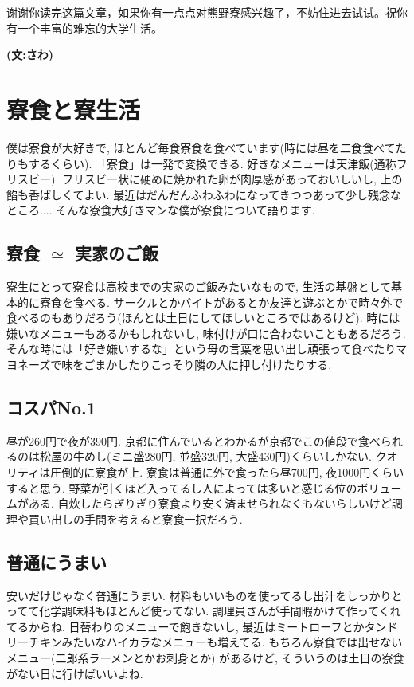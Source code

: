 \documentclass[10pt,b5jsbook,dvips,dvipdfmx,openany]{jsbook}
\theoremstyle{definition}
\begin{document}
谢谢你读完这篇文章，如果你有一点点对熊野寮感兴趣了，不妨住进去试试。祝你有一个丰富的难忘的大学生活。



    {\bf (文:さわ)}

	\section{寮食と寮生活}

	僕は寮食が大好きで, ほとんど毎食寮食を食べています(時には昼を二食食べてたりもするくらい). 「寮食」は一発で変換できる. 好きなメニューは天津飯(通称フリスビー). フリスビー状に硬めに焼かれた卵が肉厚感があっておいしいし, 上の餡も香ばしくてよい. 最近はだんだんふわふわになってきつつあって少し残念なところ.... そんな寮食大好きマンな僕が寮食について語ります.

		\subsection{寮食 $ \simeq $ 実家のご飯}
		寮生にとって寮食は高校までの実家のご飯みたいなもので, 生活の基盤として基本的に寮食を食べる. サークルとかバイトがあるとか友達と遊ぶとかで時々外で食べるのもありだろう(ほんとは土日にしてほしいところではあるけど). 時には嫌いなメニューもあるかもしれないし, 味付けが口に合わないこともあるだろう. そんな時には「好き嫌いするな」という母の言葉を思い出し頑張って食べたりマヨネーズで味をごまかしたりこっそり隣の人に押し付けたりする.

		\subsection{コスパNo.1}
		昼が260円で夜が390円. 京都に住んでいるとわかるが京都でこの値段で食べられるのは松屋の牛めし(ミニ盛280円, 並盛320円, 大盛430円)くらいしかない. クオリティは圧倒的に寮食が上. 寮食は普通に外で食ったら昼700円, 夜1000円くらいすると思う. 野菜が引くほど入ってるし人によっては多いと感じる位のボリュームがある. 自炊したらぎりぎり寮食より安く済ませられなくもないらしいけど調理や買い出しの手間を考えると寮食一択だろう.

		\subsection{普通にうまい}
		安いだけじゃなく普通にうまい. 材料もいいものを使ってるし出汁をしっかりとってて化学調味料もほとんど使ってない. 調理員さんが手間暇かけて作ってくれてるからね. 日替わりのメニューで飽きないし, 最近はミートローフとかタンドリーチキンみたいなハイカラなメニューも増えてる. もちろん寮食では出せないメニュー(二郎系ラーメンとかお刺身とか) があるけど, そういうのは土日の寮食がない日に行けばいいよね.
\end{document}
